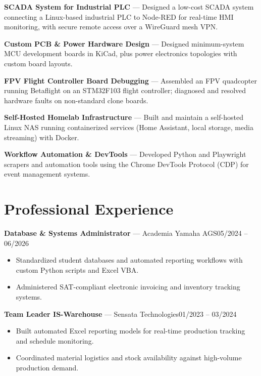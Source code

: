 \documentclass[10.5pt,a4paper]{article}
\begin{document}
\vspace{0.15em}
\textbf{SCADA System for Industrial PLC} --- Designed a low-cost SCADA system connecting a Linux-based industrial PLC to Node-RED for real-time HMI monitoring, with secure remote access over a WireGuard mesh VPN.

\vspace{0.15em}
\textbf{Custom PCB \& Power Hardware Design} --- Designed minimum-system MCU development boards in KiCad, plus power electronics topologies with custom board layouts.

\vspace{0.15em}
\textbf{FPV Flight Controller Board Debugging} --- Assembled an FPV quadcopter running Betaflight on an STM32F103 flight controller; diagnosed and resolved hardware faults on non-standard clone boards.

\vspace{0.15em}
\textbf{Self-Hosted Homelab Infrastructure} --- Built and maintain a self-hosted Linux NAS running containerized services (Home Assistant, local storage, media streaming) with Docker.

\vspace{0.15em}
\textbf{Workflow Automation \& DevTools} --- Developed Python and Playwright scrapers and automation tools using the Chrome DevTools Protocol (CDP) for event management systems.

\section*{Professional Experience}

\textbf{Database \& Systems Administrator} --- Academia Yamaha AGS\hfill 05/2024 -- 06/2026
\begin{itemize}
	\item Standardized student databases and automated reporting workflows with custom Python scripts and Excel VBA.
	\item Administered SAT-compliant electronic invoicing and inventory tracking systems.
\end{itemize}
\textbf{Team Leader IS-Warehouse} --- Sensata Technologies\hfill 01/2023 -- 03/2024
\begin{itemize}
	\item Built automated Excel reporting models for real-time production tracking and schedule monitoring.
	\item Coordinated material logistics and stock availability against high-volume production demand.
\end{itemize}
\end{document}
